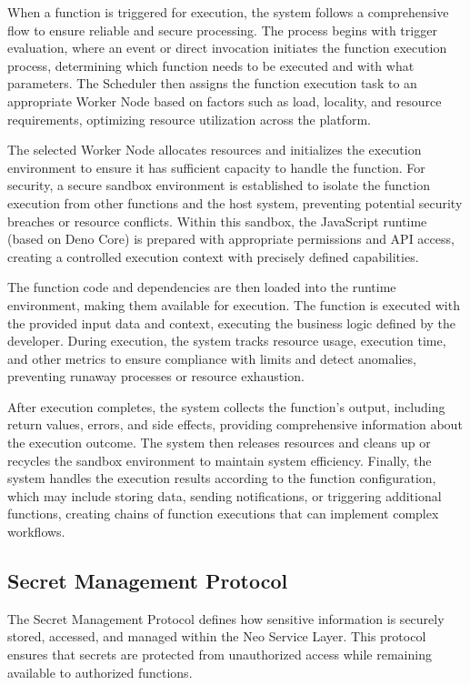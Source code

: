 \documentclass[12pt,a4paper]{article}
\begin{document}
When a function is triggered for execution, the system follows a comprehensive flow to ensure reliable and secure processing. The process begins with trigger evaluation, where an event or direct invocation initiates the function execution process, determining which function needs to be executed and with what parameters. The Scheduler then assigns the function execution task to an appropriate Worker Node based on factors such as load, locality, and resource requirements, optimizing resource utilization across the platform.

The selected Worker Node allocates resources and initializes the execution environment to ensure it has sufficient capacity to handle the function. For security, a secure sandbox environment is established to isolate the function execution from other functions and the host system, preventing potential security breaches or resource conflicts. Within this sandbox, the JavaScript runtime (based on Deno Core) is prepared with appropriate permissions and API access, creating a controlled execution context with precisely defined capabilities.

The function code and dependencies are then loaded into the runtime environment, making them available for execution. The function is executed with the provided input data and context, executing the business logic defined by the developer. During execution, the system tracks resource usage, execution time, and other metrics to ensure compliance with limits and detect anomalies, preventing runaway processes or resource exhaustion.

After execution completes, the system collects the function's output, including return values, errors, and side effects, providing comprehensive information about the execution outcome. The system then releases resources and cleans up or recycles the sandbox environment to maintain system efficiency. Finally, the system handles the execution results according to the function configuration, which may include storing data, sending notifications, or triggering additional functions, creating chains of function executions that can implement complex workflows.

\subsection{Secret Management Protocol}
\label{subsec:secret-protocol-spec}

The Secret Management Protocol defines how sensitive information is securely stored, accessed, and managed within the Neo Service Layer. This protocol ensures that secrets are protected from unauthorized access while remaining available to authorized functions.
\end{document}

